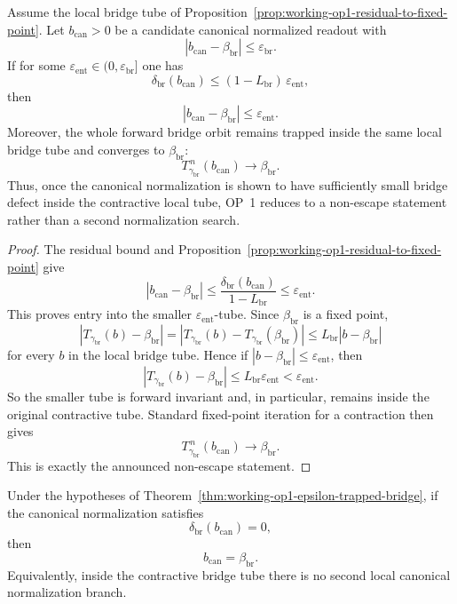 \begin{theorem}
\label{thm:working-op1-epsilon-trapped-bridge}
Assume the local bridge tube of Proposition~\ref{prop:working-op1-residual-to-fixed-point}. Let \(b_{\mathrm{can}}>0\) be a candidate canonical normalized readout with
\[
  |b_{\mathrm{can}}-\beta_{\mathrm{br}}|\le \varepsilon_{\mathrm{br}}.
\]
If for some \(\varepsilon_{\mathrm{ent}}\in(0,\varepsilon_{\mathrm{br}}]\) one has
\[
  \delta_{\mathrm{br}}(b_{\mathrm{can}})
  \le
  (1-L_{\mathrm{br}})\,\varepsilon_{\mathrm{ent}},
\]
then
\[
  |b_{\mathrm{can}}-\beta_{\mathrm{br}}|\le \varepsilon_{\mathrm{ent}}.
\]
Moreover, the whole forward bridge orbit remains trapped inside the same local bridge tube and converges to \(\beta_{\mathrm{br}}\):
\[
  T_{\gamma_{\mathrm{br}}}^{\,n}(b_{\mathrm{can}})\to \beta_{\mathrm{br}}.
\]
Thus, once the canonical normalization is shown to have sufficiently small bridge defect inside the contractive local tube, OP~1 reduces to a non-escape statement rather than a second normalization search.
\end{theorem}

\begin{proof}
The residual bound and Proposition~\ref{prop:working-op1-residual-to-fixed-point} give
\[
  |b_{\mathrm{can}}-\beta_{\mathrm{br}}|
  \le
  \frac{\delta_{\mathrm{br}}(b_{\mathrm{can}})}{1-L_{\mathrm{br}}}
  \le
  \varepsilon_{\mathrm{ent}}.
\]
This proves entry into the smaller \(\varepsilon_{\mathrm{ent}}\)-tube. Since \(\beta_{\mathrm{br}}\) is a fixed point,
\[
  |T_{\gamma_{\mathrm{br}}}(b)-\beta_{\mathrm{br}}|
  =
  |T_{\gamma_{\mathrm{br}}}(b)-T_{\gamma_{\mathrm{br}}}(\beta_{\mathrm{br}})|
  \le
  L_{\mathrm{br}}|b-\beta_{\mathrm{br}}|
\]
for every \(b\) in the local bridge tube. Hence if \(|b-\beta_{\mathrm{br}}|\le \varepsilon_{\mathrm{ent}}\), then
\[
  |T_{\gamma_{\mathrm{br}}}(b)-\beta_{\mathrm{br}}|
  \le
  L_{\mathrm{br}}\varepsilon_{\mathrm{ent}}
  <
  \varepsilon_{\mathrm{ent}}.
\]
So the smaller tube is forward invariant and, in particular, remains inside the original contractive tube. Standard fixed-point iteration for a contraction then gives
\[
  T_{\gamma_{\mathrm{br}}}^{\,n}(b_{\mathrm{can}})\to \beta_{\mathrm{br}}.
\]
This is exactly the announced non-escape statement.
\end{proof}

\begin{corollary}
\label{cor:working-op1-exact-closure-criterion}
Under the hypotheses of Theorem~\ref{thm:working-op1-epsilon-trapped-bridge}, if the canonical normalization satisfies
\[
  \delta_{\mathrm{br}}(b_{\mathrm{can}})=0,
\]
then
\[
  b_{\mathrm{can}}=\beta_{\mathrm{br}}.
\]
Equivalently, inside the contractive bridge tube there is no second local canonical normalization branch.
\end{corollary}

